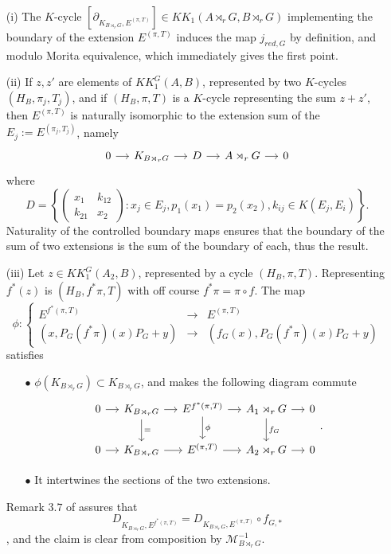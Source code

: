 \begin{dem}
\begin{enumerate}

\item[(i)]The $K$-cycle $[\partial_{K_{B\rtimes_r G},E^{(\pi,T)}}]\in KK_1(A\rtimes_r G, B\rtimes_r G)$ implementing the boundary of the extension $E^{(\pi,T)}$ induces the map $j_{red,G}$ by definition, and modulo Morita equivalence, which immediately gives the first point.

\item[(ii)] If $z,z'$ are elements of $KK_1^G(A,B)$, represented by two $K$-cycles $(H_B,\pi_j,T_j)$, and if $(H_B,\pi,T)$ is a $K$-cycle representing the sum $z+z'$, then $E^{(\pi,T)}$ is naturally isomorphic to the extension sum of the $E_j:=E^{(\pi_j,T_j)}$, namely
\[\begin{tikzcd}[column sep = small]
0\arrow{r} & K_{B\rtimes_r G} \arrow{r} & D \arrow{r} & A\rtimes_r G \arrow{r} & 0
\end{tikzcd}\]
where 
\[D=\left\{\begin{pmatrix}x_1 & k_{12}\\ k_{21} & x_2\end{pmatrix} : x_j\in E_j , p_1(x_1)=p_2(x_2), k_{ij}\in K(E_j,E_i)\right\}.\]
Naturality of the controlled boundary maps \cite{OY2} ensures that the boundary of the sum of two extensions is the sum of the boundary of each, thus the result.
\item[(iii)] Let $z\in KK_1^G(A_2,B)$, represented by a cycle $(H_B,\pi,T)$. Representing $f^*(z)$ is $(H_B,f^*\pi,T)$ with off course $f^*\pi=\pi \circ f$. The map 
\[\phi : \left\{\begin{array}{lll} E^{f^*(\pi,T)} & \rightarrow & E^{(\pi,T)} \\
( x, P_G(f^*\pi)(x)P_G+y) & \rightarrow & ( f_G(x), P_G(f^*\pi)(x)P_G+y) \end{array}\right. \]
satisfies
\begin{enumerate}
\item[$\bullet$] $\phi(K_{B\rtimes_r G})\subset K_{B\rtimes_r G}$, and makes the following diagram commute
\[\begin{tikzcd}[column sep = small]
0\arrow{r} & K_{B\rtimes_r G}\arrow{r}\arrow{d}{=} & E^{f^*(\pi,T)} \arrow{r}\arrow{d}{\phi}& A_1\rtimes_r G\arrow{r}\arrow{d}{f_G} & 0\\
0\arrow{r} & K_{B\rtimes_r G}\arrow{r} & E^{(\pi,T)} \arrow{r}& A_2\rtimes_r G\arrow{r} & 0
\end{tikzcd}.\]
\item[$\bullet$] It intertwines the sections of the two extensions.
\end{enumerate}
Remark $3.7$ of \cite{OY2} assures that \[D_{K_{B\rtimes_r G}, E^{f^*(\pi,T)} } =  D_{K_{B\rtimes_r G}, E^{(\pi,T)} }\circ f_{G,*}\], and the claim is clear from composition by $\mathcal M_{B\rtimes_r G}^{-1}$.


\end{enumerate}
\end{dem}
